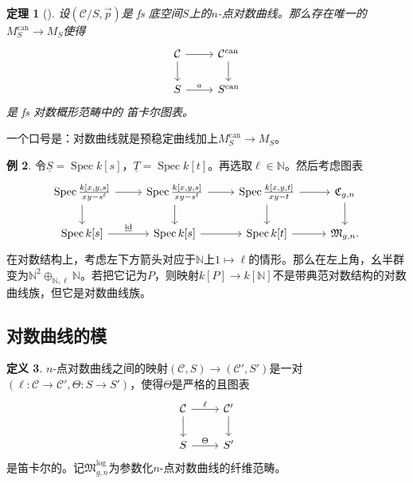 \documentclass{amsart}
\newtheorem{thm}{定理}[section]
\theoremstyle{definition}
\newtheorem{defn}[thm]{定义}
\newtheorem{exm}[thm]{例}
\theoremstyle{remark}
\theoremstyle{plain}
\theoremstyle{definition}
\theoremstyle{remark}
\newcommand{\N}{\mathbb{N}}
\newcommand{\mc}[1]{\mathcal{#1}}
\newcommand{\mf}[1]{\mathfrak{#1}}
\newcommand{\on}[1]{\operatorname{#1}}
\newcommand{\ul}[1]{\underline{#1}}
\newcommand{\1}{\mathbf{1}}
\newcommand{\2}{\mathbf{2}}
\newcommand{\3}{\mathbf{3}}
\DeclareMathOperator{\Spec}{Spec}
\begin{document}
\begin{thm}[{\cite{FKato2000}}]
    设\((\mc{C}/S, \vec{p})\)是 fs 底空间\(S\)上的\(n\)-点对数曲线。那么存在唯一的\(M_S^{\on{can}} \to M_S\)使得
    \begin{equation*}
    \begin{tikzcd}
        \mc{C} \ar{d} \ar{r} & \mc{C}^{\on{can}} \ar{d} \\
        S \ar{r}{a} & S^{\on{can}}
    \end{tikzcd}
    \end{equation*}
    是 fs 对数概形范畴中的 笛卡尔图表。
\end{thm}

一个口号是：对数曲线就是预稳定曲线加上\(M_S^{\on{can}} \to M_S\)。

\begin{exm}
    令\(\ul{S} = \Spec k[s]\)，\(\ul{T} = \Spec k[t]\)。再选取\(\ell \in \N\)。然后考虑图表
    \begin{equation*}
    \begin{tikzcd}
        \Spec \frac{k{ [x,y,s] }}{xy-s^{\ell}} \ar{d} \ar{r} & \Spec \frac{k{ [x,y,s] }}{xy-s^{\ell}} \ar{d} \ar{r} & \Spec  \frac{k{[x,y,t]}}{xy-t} \ar{r}\ar{d} & \mf{C}_{g,n} \ar{d} \\
        \Spec k{[s]} \ar{r}{\ul{ \on{id} }} & \Spec {k[s]} \ar{r} & \Spec k{[t]} \ar{r} & \mf{M}_{g,n}.
    \end{tikzcd}
    \end{equation*}
    在对数结构上，考虑左下方箭头对应于\(\N\)上\(1 \mapsto \ell\)的情形。那么在左上角，幺半群变为\(\N^2 \oplus_{\N, \ell} \N\)。若把它记为\(P\)，则映射\(k[P] \to k[\N]\)不是带典范对数结构的对数曲线族，但它是对数曲线族。
\end{exm}

\subsection{对数曲线的模}%
\label{sub:Moduli of log curves}

\begin{defn}
    \(n\)-点对数曲线之间的映射\((\mc{C}, S) \to (\mc{C}', S')\)是一对\((\ell \colon \mc{C} \to \mc{C}', \Theta \colon S \to S')\)，使得\(\Theta\)是严格的且图表
    \begin{equation*}
    \begin{tikzcd}
        \mc{C} \ar{d} \ar{r}{\ell} & \mc{C}' \ar{d} \\
        S \ar{r}{\Theta} & S'
    \end{tikzcd}
    \end{equation*}
    是笛卡尔的。记\(\mf{M}_{g,n}^{\log}\)为参数化\(n\)-点对数曲线的纤维范畴。
\end{defn}
\end{document}
